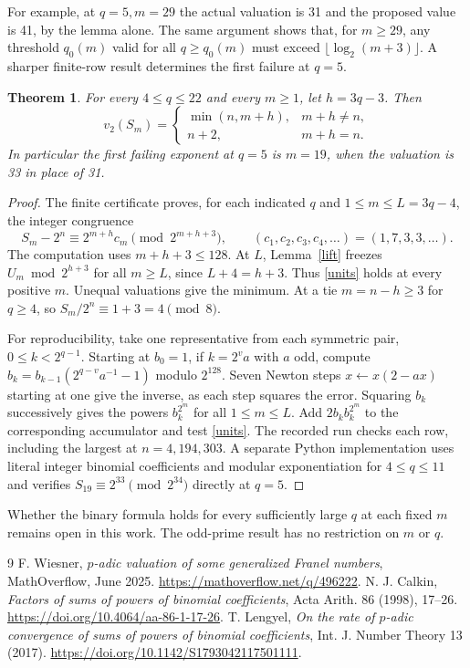 \documentclass[11pt]{article}
\newtheorem{theorem}{Theorem}
\begin{document}
For example, at $q=5,m=29$ the actual valuation is 31 and the proposed value is 41, by the lemma alone. The same argument shows that, for $m\ge29$, any threshold $q_0(m)$ valid for all $q\ge q_0(m)$ must exceed $\lfloor\log_2(m+3)\rfloor$. A sharper finite-row result determines the first failure at $q=5$.
\begin{theorem}\label{finite}
For every $4\le q\le22$ and every $m\ge1$, let $h=3q-3$. Then
\[
 v_2(S_m)=\begin{cases}\min(n,m+h),&m+h\ne n,\\n+2,&m+h=n.\end{cases}
\]
In particular the first failing exponent at $q=5$ is $m=19$, when the valuation is 33 in place of 31.
\end{theorem}
\begin{proof}
The finite certificate proves, for each indicated $q$ and $1\le m\le L=3q-4$, the integer congruence
\begin{equation}\label{units}
 S_m-2^n\equiv 2^{m+h}c_m\pmod{2^{m+h+3}},\qquad
 (c_1,c_2,c_3,c_4,\ldots)=(1,7,3,3,\ldots).
\end{equation}
The computation uses $m+h+3\le128$. At $L$, Lemma~\ref{lift} freezes $U_m\bmod 2^{h+3}$ for all $m\ge L$, since $L+4=h+3$. Thus \eqref{units} holds at every positive $m$. Unequal valuations give the minimum. At a tie $m=n-h\ge3$ for $q\ge4$, so $S_m/2^n\equiv1+3=4\pmod8$.

For reproducibility, take one representative from each symmetric pair, $0\le k<2^{q-1}$. Starting at $b_0=1$, if $k=2^v a$ with $a$ odd, compute $b_k=b_{k-1}(2^{q-v}a^{-1}-1)$ modulo $2^{128}$. Seven Newton steps $x\gets x(2-ax)$ starting at one give the inverse, as each step squares the error. Squaring $b_k$ successively gives the powers $b_k^{2^m}$ for all $1\le m\le L$. Add $2b_k b_k^{2^m}$ to the corresponding accumulator and test \eqref{units}. The recorded run checks each row, including the largest at $n=4{,}194{,}303$. A separate Python implementation uses literal integer binomial coefficients and modular exponentiation for $4\le q\le11$ and verifies $S_{19}\equiv 2^{33}\pmod{2^{34}}$ directly at $q=5$.
\end{proof}
Whether the binary formula holds for every sufficiently large $q$ at each fixed $m$ remains open in this work. The odd-prime result has no restriction on $m$ or $q$.

\begin{thebibliography}{9}
 F. Wiesner, \emph{$p$-adic valuation of some generalized Franel numbers}, MathOverflow, June 2025. \url{https://mathoverflow.net/q/496222}.
 N. J. Calkin, \emph{Factors of sums of powers of binomial coefficients}, Acta Arith. 86 (1998), 17--26. \url{https://doi.org/10.4064/aa-86-1-17-26}.
 T. Lengyel, \emph{On the rate of $p$-adic convergence of sums of powers of binomial coefficients}, Int. J. Number Theory 13 (2017). \url{https://doi.org/10.1142/S1793042117501111}.
\end{thebibliography}
\end{document}
